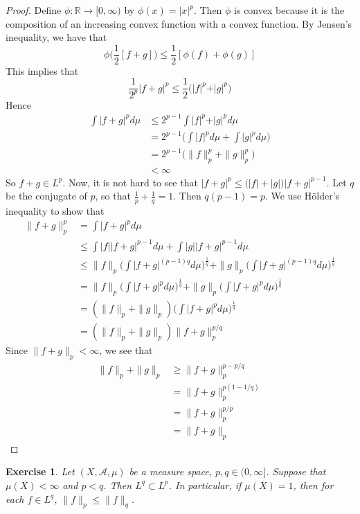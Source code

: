 \documentclass[12pt]{amsart}
\newtheorem{ex}[thm]{Exercise}
\newcommand{\R}{\mathbb{R}}
\newcommand{\MA}{\mathcal{A}}
\newcommand{\Rg}{[0,\infty)}
\begin{document}
	\begin{proof}
		Define $\phi:\R \rightarrow \Rg$ by $\phi(x) = \vert x \vert^p$. Then $\phi$ is convex because it is the composition of an increasing convex function with a convex function. By Jensen's inequality, we have that $$\phi\bigg(\frac{1}{2}[f+g] \bigg) \leq \frac{1}{2}[\phi(f)+\phi(g)]$$ 
		This implies that $$\frac{1}{2^p} \vert f+g\vert^p \leq \frac{1}{2}\bigg(\vert f\vert^p +\vert g \vert^p\bigg)$$ 
		Hence 
		\begin{align*}
			\int\vert f + g\vert^p d \mu 
			& \leq 2^{p-1}\int \vert f\vert^p +\vert g\vert^p d\mu \\
			& = 2^{p-1}\bigg(\int \vert f\vert^p d\mu + \int \vert g\vert^p d\mu \bigg) \\
			&= 2^{p-1}\bigg( \|f \|_p^p + \|g \|_p^p\bigg) \\
			& < \infty
		\end{align*}
		So $f+g \in L^p$. Now, it is not hard to see that $|f+g|^p \leq \big( |f| + |g| \big)|f+g|^{p-1}$. Let $q$ be the conjugate of $p$, so that $\frac{1}{p} + \frac{1}{q} = 1$. Then $q(p-1) = p$. We use Hölder's inequality to show that 
		\begin{align*}
			\|f+g \|_p ^p
			&= \int  |f+g|^p d \mu \\
			& \leq \int |f| |f+g|^{p-1} d \mu + \int |g| |f+g|^{p-1} d \mu \\
			& \leq \|f\|_p \bigg(\int |f+g|^{(p-1)q} d\mu\bigg)^{\frac{1}{q}} + \|g\|_p \bigg(\int |f+g|^{(p-1)q}d\mu\bigg)^{\frac{1}{q}} \\
			&= \|f\|_p \bigg(\int |f+g|^{p} d\mu\bigg)^{\frac{1}{q}} + \|g\|_p \bigg(\int |f+g|^{p}d\mu\bigg)^{\frac{1}{q}} \\ 
			&= (\|f\|_p + \|g \|_p) \bigg(\int |f+g|^{p} d\mu\bigg)^{\frac{1}{q}}\\
			&= (\|f \|_p + \|g \|_p) \|f+g \|_p^{p/q}
		\end{align*}
		Since $\|f+g \|_p < \infty$, we see that
		\begin{align*}
			\|f \|_p + \|g \|_p 
			& \geq \|f+g \|_p ^{p - p/q} \\
			&=  \|f+g \|_p ^{p(1 - 1/q)} \\
			&= \|f+g \|_p ^{p/p} \\
			&= \|f+g \|_p
		\end{align*}
	\end{proof}
	
	\begin{ex}
		Let $(X, \MA, \mu)$ be a measure space, $p,q \in (0, \infty]$. Suppose that $\mu(X) < \infty$ and $p < q$. Then $L^q \subset L^p$. In particular, if $\mu(X) = 1$, then for each $f \in L^q$, $\|f\|_p \leq \|f\|_q$.
	\end{ex}
	
\end{document}
